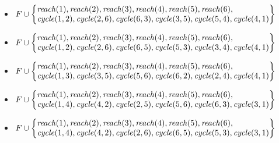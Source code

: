 \begin{Loesung}
{\begin{UList}
\begin{itemize}
\item $F\cup\left\{
            \begin{array}{@{}l@{}}
            \mathit{reach}(1),\mathit{reach}(2),\mathit{reach}(3),\mathit{reach}(4),\mathit{reach}(5),\mathit{reach}(6), {}
            \\
            \mathit{cycle}(1,2),\mathit{cycle}(2,6),\mathit{cycle}(6,3),\mathit{cycle}(3,5),\mathit{cycle}(5,4),\mathit{cycle}(4,1)
            \end{array}
            \right\}$
\item $F\cup\left\{
            \begin{array}{@{}l@{}}
            \mathit{reach}(1),\mathit{reach}(2),\mathit{reach}(3),\mathit{reach}(4),\mathit{reach}(5),\mathit{reach}(6), {}
            \\
            \mathit{cycle}(1,2),\mathit{cycle}(2,6),\mathit{cycle}(6,5),\mathit{cycle}(5,3),\mathit{cycle}(3,4),\mathit{cycle}(4,1)
            \end{array}
            \right\}$
\item $F\cup\left\{
            \begin{array}{@{}l@{}}
            \mathit{reach}(1),\mathit{reach}(2),\mathit{reach}(3),\mathit{reach}(4),\mathit{reach}(5),\mathit{reach}(6), {}
            \\
            \mathit{cycle}(1,3),\mathit{cycle}(3,5),\mathit{cycle}(5,6),\mathit{cycle}(6,2),\mathit{cycle}(2,4),\mathit{cycle}(4,1)
            \end{array}
            \right\}$
\item $F\cup\left\{
            \begin{array}{@{}l@{}}
            \mathit{reach}(1),\mathit{reach}(2),\mathit{reach}(3),\mathit{reach}(4),\mathit{reach}(5),\mathit{reach}(6), {}
            \\
            \mathit{cycle}(1,4),\mathit{cycle}(4,2),\mathit{cycle}(2,5),\mathit{cycle}(5,6),\mathit{cycle}(6,3),\mathit{cycle}(3,1)
            \end{array}
            \right\}$
\item $F\cup\left\{
            \begin{array}{@{}l@{}}
            \mathit{reach}(1),\mathit{reach}(2),\mathit{reach}(3),\mathit{reach}(4),\mathit{reach}(5),\mathit{reach}(6), {}
            \\
            \mathit{cycle}(1,4),\mathit{cycle}(4,2),\mathit{cycle}(2,6),\mathit{cycle}(6,5),\mathit{cycle}(5,3),\mathit{cycle}(3,1)
            \end{array}
            \right\}$
\end{itemize}
\end{UList}}
\end{Loesung}

